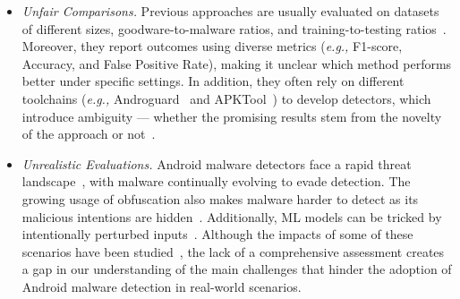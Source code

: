 \begin{itemize}[leftmargin=10pt, itemsep=2pt]
  \item \textit{Unfair Comparisons.}
  Previous approaches are usually evaluated on datasets of different sizes, goodware-to-malware ratios, and training-to-testing ratios~\cite{arp2014drebin,hou2017hindroid,li2021robust}.
  Moreover, they report outcomes using diverse metrics (\textit{e.g.,} F1-score, Accuracy, and False Positive Rate), making it unclear which method performs better under specific settings.
  In addition, they often rely on different toolchains (\textit{e.g.,} Androguard~\cite{androguard} and APKTool~\cite{apkt}) to develop detectors, which introduce ambiguity --- whether the promising results stem from the novelty of the approach or not~\cite{vasilache2018tensor}.

  \item \textit{Unrealistic Evaluations.} 
  Android malware detectors face a rapid threat landscape~\cite{barbero2022transcending}, with malware continually evolving to evade detection.
  The growing usage of obfuscation also makes malware harder to detect as its malicious intentions are hidden~\cite{aonzo2020obfuscapk}.
  Additionally, ML models can be tricked by intentionally perturbed inputs~\cite{pierazzi2020problemspace,carlini2017towards,suya2020hybrid,grosse2017adversarial}.
  Although the impacts of some of these scenarios have been studied~\cite{jordaney2017transcend, barbero2022transcending,pendlebury2019tesseract,ceschin2020machine}, the lack of a comprehensive assessment creates a gap in our understanding of the main challenges that hinder the adoption of Android malware detection in real-world scenarios.


\end{itemize}
